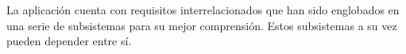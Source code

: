 La aplicación cuenta con requisitos interrelacionados que han sido englobados en una serie de subsistemas para su mejor comprensión. Estos subsistemas a su vez pueden depender entre sí.